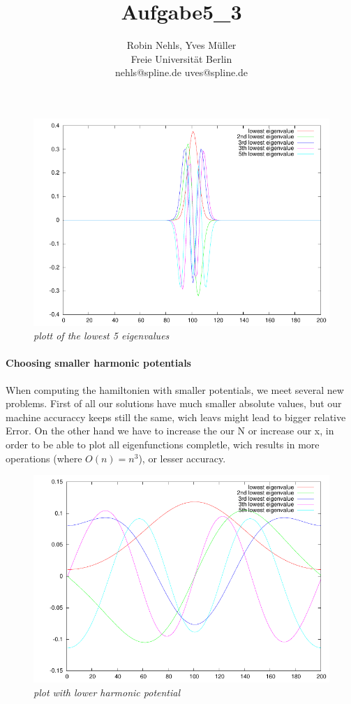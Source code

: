 \documentclass[11pt,a4paper,notitlepage,onecolumn]{article}
\title{Aufgabe5\_3}
\author{Robin Nehls, Yves Müller\\
  Freie Universit\"at Berlin\\
  nehls@spline.de uves@spline.de }
\date{}
\begin{document}
\maketitle

\paragraph{}

\begin{figure}
\centering
\includegraphics[width=\textwidth]{aufgabe3-normal.pdf}
\caption{\em \small plott of the lowest 5 eigenvalues}
\end{figure}

\paragraph{Choosing smaller harmonic potentials}
When computing the hamiltonien with smaller potentials, we meet several new 
problems. First of all our solutions have much smaller absolute values, but
our machine accuraccy keeps still the same, wich leavs might lead to bigger
relative Error. On the other hand we have to increase the our N or increase 
our \delta x, in order to be able to plot all eigenfunctions completle,
wich results in more operations (where $O(n)=n^3$), or lesser accuracy.


\begin{figure}
\centering
\includegraphics[width=\textwidth]{aufgabe3-lowpot.pdf}
\caption{\em \small plot with lower harmonic potential}
\end{figure}
\end{document}
